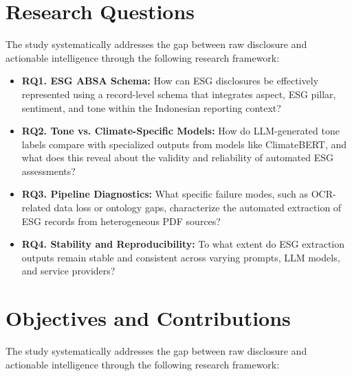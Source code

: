 \documentclass[english, online, cse, master]{dithesis}
\begin{document}
\section{Research Questions}

The study systematically addresses the gap between raw disclosure and actionable intelligence through the following research framework:
\begin{itemize}
\item 

\textbf{RQ1. ESG ABSA Schema:} How can ESG disclosures be effectively represented using a record-level schema that integrates aspect, ESG pillar, sentiment, and tone within the Indonesian reporting context?\item 

\textbf{RQ2. Tone vs. Climate-Specific Models:} How do LLM-generated tone labels compare with specialized outputs from models like ClimateBERT, and what does this reveal about the validity and reliability of automated ESG assessments?\item 

\textbf{RQ3. Pipeline Diagnostics:} What specific failure modes, such as OCR-related data loss or ontology gaps, characterize the automated extraction of ESG records from heterogeneous PDF sources?\item 

\textbf{RQ4. Stability and Reproducibility:} To what extent do ESG extraction outputs remain stable and consistent across varying prompts, LLM models, and service providers?
\end{itemize}
\section{Objectives and Contributions}

The study systematically addresses the gap between raw disclosure and actionable intelligence through the following research framework:
\end{document}
